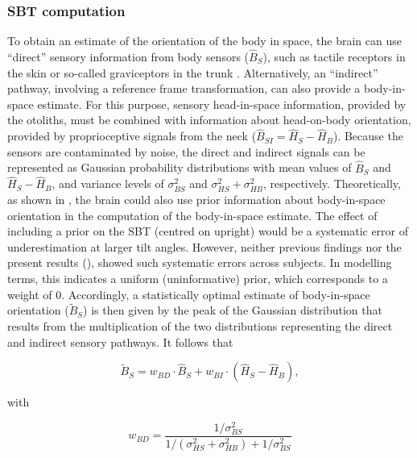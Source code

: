 \subsubsection{SBT computation}
\label{p1:sec:sbt_computation}
 
To obtain an estimate of the orientation of the body in space, the brain can use ``direct'' sensory information from body sensors ($\hat{B}_S$), such as tactile receptors in the skin or so-called graviceptors in the trunk \cite{mittelstaedt1997, mittelstaedt1998, vaitl2002}. Alternatively, an ``indirect'' pathway, involving a reference frame transformation, can also provide a body-in-space estimate. For this purpose, sensory head-in-space information, provided by the otoliths, must be combined with information about head-on-body orientation, provided by proprioceptive signals from the neck ($\hat{B}_{SI} = \hat{H}_S - \hat{H}_B$). Because the sensors are contaminated by noise, the direct and indirect signals can be represented as Gaussian probability distributions with mean values of $\hat{B}_S$ and $\hat{H}_S - \hat{H}_B$, and variance levels of $\sigma_{BS}^2$ and $\sigma_{HS}^2 + \sigma_{HB}^2$, respectively. Theoretically, as shown in , the brain could also use prior information about body-in-space orientation in the computation of the body-in-space estimate. The effect of including a prior on the SBT (centred on upright) would be a systematic error of underestimation at larger tilt angles. However, neither previous findings \cite{mittelstaedt1983, mast1996, jarchow1999, vanbeuzekom2001} nor the present results (), showed such systematic errors across subjects. In modelling terms, this indicates a uniform (uninformative) prior, which corresponds to a weight of 0. Accordingly, a statistically optimal estimate of body-in-space orientation ($\tilde{B}_S$) is then given by the peak of the Gaussian distribution that results from the multiplication of the two distributions representing the direct and indirect sensory pathways. It follows that

\begin{equation}
\label{p1:eqn2}
\tilde{B}_S = w_{BD} \cdot \hat{B}_S + w_{BI} \cdot (\hat{H}_S - \hat{H}_B),
\end{equation}

with

\begin{equation}
\label{p1:eqn3}
w_{BD} = \frac{1/\sigma^2_{BS}}{1/(\sigma^2_{HS} + \sigma^2_{HB}) + 1/\sigma^2_{BS}}
\end{equation}

